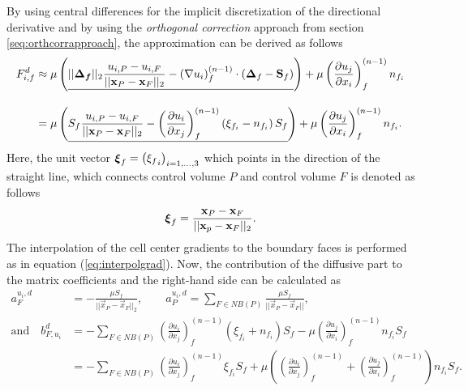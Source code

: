 By using central differences for the implicit discretization of the directional derivative and by using the \emph{orthogonal correction} approach from section \ref{seq:orthcorrapproach}, the approximation can be derived as follows
\begin{align*}
  F_{i,f}^d 
  &\approx 
  \mu \left( \underline{||\boldsymbol{\boldsymbol{\Delta}_f}||_2 \frac{u_{i,P} - u_{i,F}}{ || \mathbf{x}_P - \mathbf{x}_F ||_2 }  
  -  \left(\nabla u_i \right)_f^{(n-1)} \cdot \left(\boldsymbol{\Delta}_f - \mathbf{S}_f\right)  }  \right)
  + \mu \left( \frac{\partial u_j}{\partial x_i} \right)_f^{(n-1)} n_{f_i} \\[1em]
  &= \mu \left(\underline{  S_f \frac{u_{i,P} - u_{i,F}}{ || \mathbf{x}_P - \mathbf{x}_F ||_2 }  
  - \left( \frac{\partial u_i}{\partial x_j}\right)_f^{(n-1)} \left(\xi_{f_i} - n_{f_i}\right)S_f  } \right)
  + \mu \left( \frac{\partial u_j}{\partial x_i} \right)_f^{(n-1)} n_{f_i}.
\end{align*}
Here, the unit vector \(\boldsymbol{\xi}_f = \left({\xi_f}_i\right)_{i = 1,\dots,3}\) which points in the direction of the straight line, which connects control volume \(P\) and control volume \(F\) is denoted as follows
\begin{displaymath}
  \boldsymbol{\xi}_f = \frac{\mathbf{x}_P - \mathbf{x}_F}{|| \mathbf{x}_p - \mathbf{x}_F ||_2}.
\end{displaymath}
The interpolation of the cell center gradients to the boundary faces is performed as in equation (\ref{eq:interpolgrad}). Now, the contribution of the diffusive part to the matrix coefficients and the right-hand side can be calculated as
\begin{align*}
  a_F^{u_i,d} &= - \frac{\mu S_f}{||\vec{x}_P - \vec{x}_F||_2}, 
  \quad \quad a_P^{u_i,d} = \sum_{F \in NB(P)} \frac{\mu S_f}{|| \vec{x}_P - \vec{x}_F ||} ,\\[1em]
  \textrm{and} \quad b_{F,u_i}^d &=  - \sum_{F \in NB(P)} \left( \frac{\partial u_i}{\partial x_j}\right)_f^{(n-1)} \left(\xi_{f_i} + n_{f_i}\right)S_f  
  - \mu \left( \frac{\partial u_j}{\partial x_i} \right)_f^{(n-1)} n_{f_i} S_f   \nonumber \\[0.5em]
  &=  - \sum_{F \in NB(P)} \left( \frac{\partial u_i}{\partial x_j}\right)_f^{(n-1)} \xi_{f_i} S_f
  + \mu \left( \left( \frac{\partial u_i}{\partial x_j} \right)_f^{(n-1)}
  + \left( \frac{\partial u_j}{\partial x_i} \right)_f^{(n-1)} \right) n_{f_i} S_f.
\end{align*}

